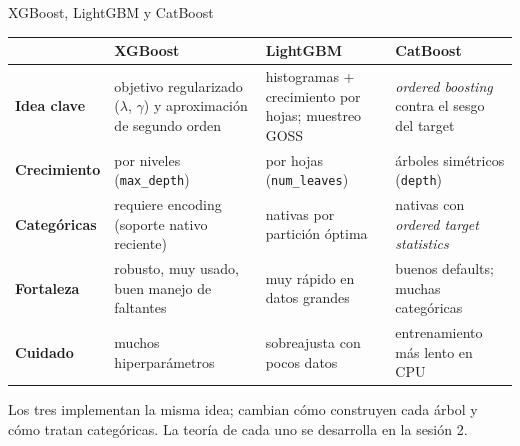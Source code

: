 \documentclass[aspectratio=169,12pt]{beamer}
\newcommand{\hrow}{\rowcolor{mlcream}}
\begin{document}
\begin{frame}{XGBoost, LightGBM y CatBoost}
  \centering\scriptsize
  \begin{tabularx}{\textwidth}{@{}l >{\raggedright\arraybackslash}X >{\raggedright\arraybackslash}X >{\raggedright\arraybackslash}X@{}}
    \toprule
    \hrow & \textbf{XGBoost} & \textbf{LightGBM} & \textbf{CatBoost} \\
    \midrule
    \textbf{Idea clave} & objetivo regularizado ($\lambda$, $\gamma$) y aproximación de segundo orden & histogramas + crecimiento por hojas; muestreo GOSS & \emph{ordered boosting} contra el sesgo del target \\
    \textbf{Crecimiento} & por niveles (\texttt{max\_depth}) & por hojas (\texttt{num\_leaves}) & árboles simétricos (\texttt{depth}) \\
    \textbf{Categóricas} & requiere encoding (soporte nativo reciente) & nativas por partición óptima & nativas con \emph{ordered target statistics} \\
    \textbf{Fortaleza} & robusto, muy usado, buen manejo de faltantes & muy rápido en datos grandes & buenos defaults; muchas categóricas \\
    \textbf{Cuidado} & muchos hiperparámetros & sobreajusta con pocos datos & entrenamiento más lento en CPU \\
    \bottomrule
  \end{tabularx}
  \vspace{4pt}
  \raggedright\footnotesize Los tres implementan la misma idea; cambian cómo construyen cada árbol y cómo tratan categóricas. La teoría de cada uno se desarrolla en la sesión 2.
\end{frame}
\end{document}

